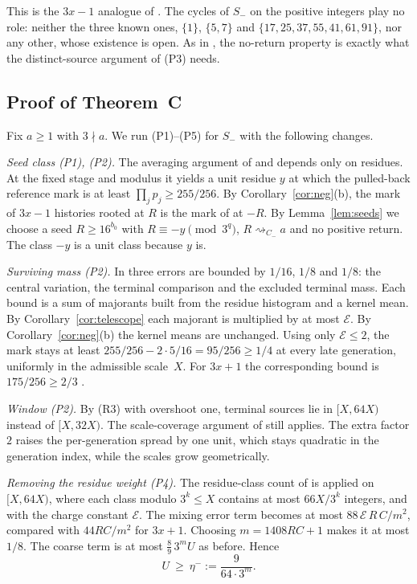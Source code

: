 \documentclass[11pt]{amsart}
\theoremstyle{definition}
\theoremstyle{remark}
\newcommand{\Cm}{C_{-}}
\newcommand{\Sm}{S_{-}}
\newcommand{\reach}[1]{\mathrel{\rightsquigarrow_{#1}}}
\newcommand{\E}{\mathcal{E}}
\begin{document}
This is the $3x-1$ analogue of \cite[Lemma~2.3]{MazurM2}. The cycles of $\Sm$ on the positive
integers play no role: neither the three known ones, $\{1\}$, $\{5,7\}$ and
$\{17,25,37,55,41,61,91\}$, nor any other, whose existence is open. As in
\cite[Lemma~4.1]{MazurM2}, the no-return property is exactly what the distinct-source argument of
(P3) needs.

\subsection{Proof of Theorem~C}
Fix $a\ge1$ with $3\nmid a$. We run (P1)--(P5) for $\Sm$ with the following changes.

\emph{Seed class (P1), (P2).} The averaging argument of \cite[\S8.3]{MazurM1} and
\cite[Appendix~A.2]{MazurM2} depends only on residues. At the fixed stage and modulus it yields a
unit residue $y$ at which the pulled-back reference mark is at least $\prod_jp_j\ge255/256$. By
Corollary~\ref{cor:neg}(b), the mark of $3x-1$ histories rooted at $R$ is the mark of
\cite{MazurM1} at $-R$. By Lemma~\ref{lem:seeds} we choose a seed $R\ge16^{b_0}$ with $R\equiv-y\pmod{3^q}$,
$R\reach{\Cm}a$ and no positive return. The class $-y$ is a unit class because $y$ is.

\emph{Surviving mass (P2).} In \cite[\S8.3]{MazurM1} three errors are bounded by $1/16$, $1/8$ and $1/8$: the central
variation, the terminal comparison and the excluded terminal mass. Each
bound is a sum of majorants built from the residue histogram and a kernel mean. By
Corollary~\ref{cor:telescope} each majorant is multiplied by at most $\E$. By
Corollary~\ref{cor:neg}(b) the kernel means are unchanged. Using only $\E\le2$, the mark stays at
least $255/256-2\cdot5/16=95/256\ge1/4$ at every late generation, uniformly in the admissible
scale~$X$. For $3x+1$ the corresponding bound is $175/256\ge2/3$ \cite[(8.8)]{MazurM1}.

\emph{Window (P2).} By (R3) with overshoot one, terminal sources lie in $[X,64X)$ instead of
$[X,32X)$. The scale-coverage argument of \cite[Lemma~6.2]{MazurM1} still applies. The extra
factor $2$ raises the per-generation spread by one unit, which stays quadratic in the generation
index, while the scales grow geometrically.

\emph{Removing the residue weight (P4).} The residue-class count of \cite[\S4.2]{MazurM2} is applied on $[X,64X)$, where
each class modulo $3^{k}\le X$ contains at most $66X/3^{k}$ integers, and with the charge constant
$\E$. The mixing error term becomes at most $88\,\E\,R\,C/m^{2}$, compared with $44RC/m^2$ for
$3x+1$. Choosing $m=1408RC+1$ makes it at most $1/8$. The coarse term is at most
$\frac89\,3^{m}U$ as before. Hence
\[
  U\ \ge\ \eta^{-}:=\frac{9}{64\cdot3^{m}} .
\]
\end{document}
